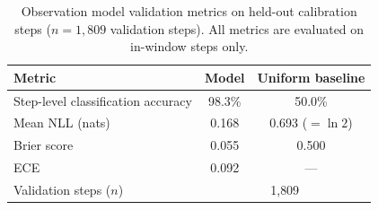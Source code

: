 \begin{table}[htbp]
\centering
\caption{Observation model validation metrics on held-out calibration steps
  ($n{=}1{,}809$ validation steps).
  All metrics are evaluated on in-window steps only.}
\label{tab:obs_model_val}
\small
\begin{tabular}{lcc}
\toprule
\textbf{Metric} & \textbf{Model} & \textbf{Uniform baseline} \\
\midrule
Step-level classification accuracy & 98.3\% & 50.0\% \\
Mean NLL (nats) & 0.168 & 0.693 ($=\ln 2$) \\
Brier score & 0.055 & 0.500 \\
ECE & 0.092 & --- \\
\midrule
Validation steps ($n$) & \multicolumn{2}{c}{1{,}809} \\
\bottomrule
\end{tabular}
\end{table}
